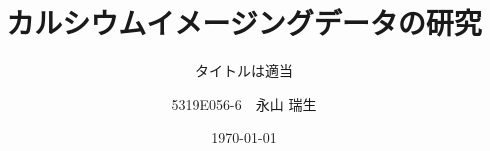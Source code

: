 \documentclass[
  leqno, %
  twoside, %
  numbers=noenddot, %
  headsepline, %
  footsepline, %
]{scrbook}
\title{カルシウムイメージングデータの研究}
\subtitle{タイトルは適当}
\author{5319E056-6　永山 瑞生}
\date{\today}
\begin{document}
\frontmatter
\maketitle

\tableofcontents

\mainmatter










\backmatter
\begin{otherlanguage}{english}
  \printbibliography[title=参考文献]
\end{otherlanguage}
\end{document}
